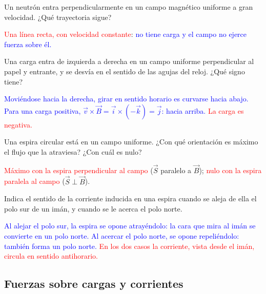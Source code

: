 \begin{exercise}
    Un neutrón entra perpendicularmente en un campo magnético uniforme a gran velocidad. ¿Qué trayectoria sigue?
    \begin{solu}
        \textcolor{red}{Una línea recta, con velocidad constante}: \textcolor{blue}{no tiene carga y el campo no ejerce fuerza sobre él.}
    \end{solu}
\end{exercise}

\begin{exercise}
    Una carga entra de izquierda a derecha en un campo uniforme perpendicular al papel y entrante, y se desvía en el sentido de las
    agujas del reloj. ¿Qué signo tiene?
    \begin{solu}
        \textcolor{blue}{Moviéndose hacia la derecha, girar en sentido horario es curvarse hacia abajo. Para una carga positiva,
        \(\vec v\times\vec B = \vec{i}\times(-\vec{k}) = \vec{j}\): hacia arriba.} \textcolor{red}{La carga es negativa.}
    \end{solu}
\end{exercise}

\begin{exercise}
    Una espira circular está en un campo uniforme. ¿Con qué orientación es máximo el flujo que la atraviesa? ¿Con cuál es nulo?
    \begin{solu}
        \textcolor{red}{Máximo con la espira perpendicular al campo} (\(\vec S\) paralelo a \(\vec B\)); \textcolor{red}{nulo con la espira paralela al campo}
        (\(\vec S\perp\vec B\)).
    \end{solu}
\end{exercise}

\begin{exercise}
    Indica el sentido de la corriente inducida en una espira cuando se aleja de ella el polo sur de un imán, y cuando se le acerca el polo norte.
    \begin{solu}
        \textcolor{blue}{Al alejar el polo sur, la espira se opone atrayéndolo: la cara que mira al imán se convierte en un polo norte. Al acercar el
        polo norte, se opone repeliéndolo: también forma un polo norte.} \textcolor{red}{En los dos casos la corriente, vista desde el imán, circula en
        sentido antihorario.}
    \end{solu}
\end{exercise}

\subsection{Fuerzas sobre cargas y corrientes}

